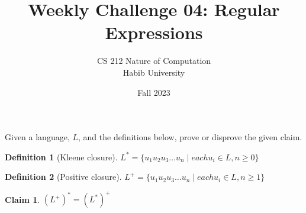 \documentclass[a4paper]{exam}
\title{Weekly Challenge 04: Regular Expressions}
\author{CS 212 Nature of Computation\\Habib University}
\date{Fall 2023}
\theoremstyle{definition}
\newtheorem{definition}{Definition}
\theoremstyle{claim}
\newtheorem{claim}{Claim}
\begin{document}
\maketitle

\begin{questions}


  Given a language, $L$, and the definitions below, prove or disprove the given claim.

  \begin{definition}[Kleene closure]
    $L^*=\{ u_1u_2u_3\ldots u_n \mid each u_i\in L, n\ge 0\}$
  \end{definition}
  \begin{definition}[Positive closure]
    $L^+=\{ u_1u_2u_3\ldots u_n \mid each u_i\in L, n\ge 1\}$
  \end{definition}

  \begin{claim}
    $(L^+)^*=(L^*)^+$
  \end{claim}  

  \begin{solution}
    
  \end{solution}
  
\end{questions}
\end{document}
